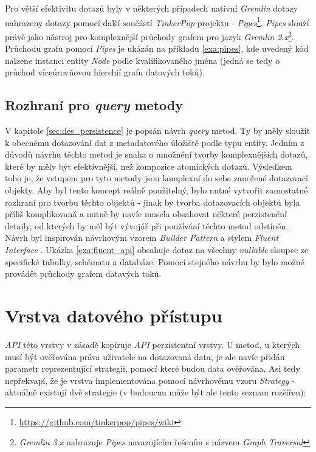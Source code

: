 Pro větší efektivitu dotazů byly v některých případech nativní \textit{Gremlin} dotazy nahrazeny dotazy pomocí další součástí \textit{TinkerPop} projektu - \textit{Pipes}\footnote{\url{https://github.com/tinkerpop/pipes/wiki}}. \textit{Pipes} slouží právě jako nástroj pro komplexnější průchody grafem pro jazyk \textit{Gremlin 2.x}\footnote{\textit{Gremlin 3.x} nahrazuje \textit{Pipes} navazujícím řešením s názvem \textit{Graph Traversal}}. Průchodu grafu pomocí \textit{Pipes} je ukázán na příkladu \ref{exa:pipes}, kde uvedený kód nalzene instanci entity \textit{Node} podle kvalifikovaného jména (jedná se tedy o průchod víceúrovňovou hierchií grafu datových toků).



\subsection{Rozhraní pro \textit{query} metody}
V kapitole \ref{sec:des_persistence} je popsán návrh \textit{query} metod. Ty by měly sloužit k obecnému dotazování dat z metadatového úložiště podle typu entity. Jedním z důvodů návrhu těchto metod je snaha o umožnění tvorby komplexnějších dotazů, které by měly být efektivnější, než kompozice atomických dotazů. Výsledkem toho je, že vstupem pro tyto metody jsou komplexní do sebe zanořené dotazovací objekty. Aby byl tento koncept reálně použitelný, bylo nutné vytvořit samostatné rozhraní pro tvorbu těchto objektů - jinak by tvorba dotazovacích objektů byla příliš komplikovaná a nutně by navíc musela obsahovat některé perzistenční detaily, od kterých by měl být vývojář při používání těchto metod odstíněn.
Návrh byl inspirován návrhovým vzorem \textit{Builder Pattern} a stylem \textit{Fluent Interface} \cite{Fowler05}. Ukázka \ref{exa:fluent_api} obsahuje dotaz na všechny \textit{nullable} sloupce ze specifické tabulky, schématu a databáze. Pomocí stejného návrhu by bylo možné provádět průchody grafem datavých toků.



\section{Vrstva datového přístupu}
\textit{API} této vrstvy v zásadě kopíruje \textit{API} perzistentní vrstvy.  U metod, u kterých musí být ověřována práva uživatele na dotazovaná data, je ale navíc přidán parametr reprezentující strategii, pomocí které budou data ověřována. Asi tedy nepřekvapí, že je vrstva implementována pomocí návrhovému vzoru \textit{Strategy} - aktuálně existují dvě strategie (v budoucnu může být ale tento seznam rozšířen):

